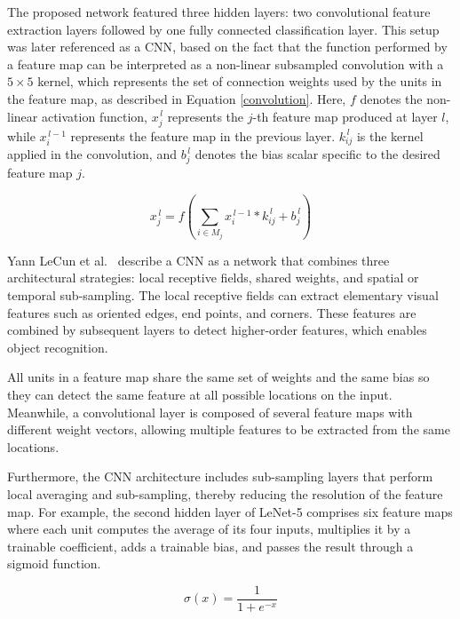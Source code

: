 The proposed network featured three hidden layers: two convolutional feature extraction layers followed by one fully connected classification layer. This setup was later referenced as a \gls{CNN}, based on the fact that the function performed by a feature map can be interpreted as a non-linear subsampled convolution with a $5 \times 5$ kernel, which represents the set of connection weights used by the units in the feature map, as described in Equation \ref{convolution}. Here, $f$ denotes the non-linear activation function, $x_j^{\,l}$ represents the $j$-th feature map produced at layer $l$, while $x_i^{\,l-1}$ represents the feature map in the previous layer. $k_{ij}^{\,l}$ is the kernel applied in the convolution, and $b_j^{\,l}$ denotes the bias scalar specific to the desired feature map $j$.

\begin{equation}
    x_j^{\,l}
    =
    f\!\left(
    \sum_{i \in M_j}
    x_i^{\,l-1} * k_{ij}^{\,l}
    +
    b_j^{\,l}
    \right)
    \label{convolution}
\end{equation}

Yann LeCun et al.~\cite{articleDocReg} describe a \gls{CNN} as a network that combines three architectural strategies: local receptive fields, shared weights, and spatial or temporal sub-sampling. The local receptive fields can extract elementary visual features such as oriented edges, end points, and corners. These features are combined by subsequent layers to detect higher-order features, which enables object recognition. 

All units in a feature map share the same set of weights and the same bias so they can detect the same feature at all possible locations on the input. Meanwhile, a convolutional layer is composed of several feature maps with different weight vectors, allowing multiple features to be extracted from the same locations.

Furthermore, the \gls{CNN} architecture includes sub-sampling layers that perform local averaging and sub-sampling, thereby reducing the resolution of the feature map. For example, the second hidden layer of LeNet-5 comprises six feature maps where each unit computes the average of its four inputs, multiplies it by a trainable coefficient, adds a trainable bias, and passes the result through a sigmoid function.

\begin{equation}
\sigma(x) = \frac{1}{1 + e^{-x}}
\label{sigmoid_function}
\end{equation}

